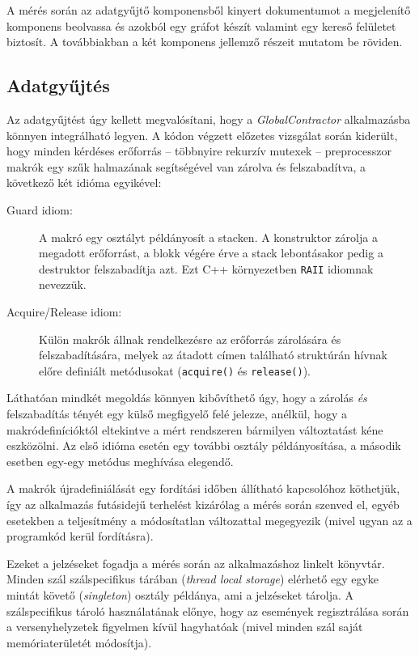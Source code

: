     A mérés során az adatgyűjtő komponensből kinyert dokumentumot a megjelenítő komponens beolvassa és azokból egy gráfot készít valamint egy kereső felületet biztosít. A továbbiakban a két komponens jellemző részeit mutatom be röviden.
    
    \subsection{Adatgyűjtés}
    Az adatgyűjtést úgy kellett megvalósítani, hogy a \emph{GlobalContractor} alkalmazásba könnyen integrálható legyen. A kódon végzett előzetes vizsgálat során kiderült, hogy minden kérdéses erőforrás -- többnyire rekurzív mutexek -- preprocesszor makrók egy szűk halmazának segítségével van zárolva és felszabadítva, a következő két idióma egyikével:
    
    \begin{description}
        \item[Guard idiom:] A makró egy osztályt példányosít a stacken. A konstruktor zárolja a megadott erőforrást, a blokk végére érve a stack lebontásakor pedig a destruktor felszabadítja azt. Ezt C++ környezetben \texttt{RAII} idiomnak nevezzük.
        \item[Acquire/Release idiom:] Külön makrók állnak rendelkezésre az erőforrás zárolására és felszabadítására, melyek az átadott címen található struktúrán hívnak előre definiált metódusokat (\texttt{acquire()} és \texttt{release()}).
    \end{description}
%    
    Láthatóan mindkét megoldás könnyen kibővíthető úgy, hogy a zárolás \emph{és} felszabadítás tényét egy külső megfigyelő felé jelezze, anélkül, hogy a makródefinícióktól eltekintve a mért rendszeren bármilyen változtatást kéne eszközölni. Az első idióma esetén egy további osztály példányosítása, a második esetben egy-egy metódus meghívása elegendő.
    
    A makrók újradefiniálását egy fordítási időben állítható kapcsolóhoz köthetjük, így az alkalmazás futásidejű terhelést kizárólag a mérés során szenved el, egyéb esetekben a teljesítmény a módosítatlan változattal megegyezik (mivel ugyan az a programkód kerül fordításra).

\medskip    
\lstset{
    basicstyle=\footnotesize\ttfamily
}    
    
\medskip

\noindent    
Ezeket a jelzéseket fogadja a mérés során az alkalmazáshoz linkelt könyvtár. Minden szál szálspecifikus tárában (\emph{thread local storage}) elérhető egy egyke mintát követő (\emph{singleton}) osztály példánya, ami a jelzéseket tárolja. A szálspecifikus tároló használatának előnye, hogy az események regisztrálása során a versenyhelyzetek figyelmen kívül hagyhatóak (mivel minden szál saját memóriaterületét módosítja).
    
